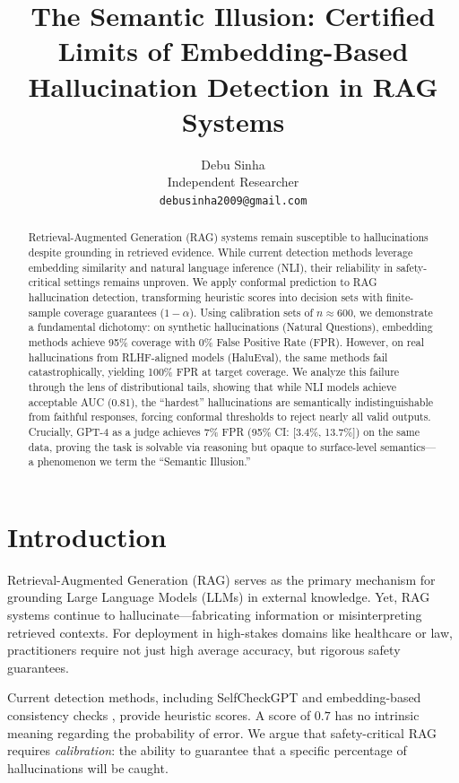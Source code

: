 \documentclass[11pt]{article}
\title{\textbf{The Semantic Illusion: Certified Limits of Embedding-Based Hallucination Detection in RAG Systems}}
\author{
  Debu Sinha \\
  Independent Researcher \\
  \texttt{debusinha2009@gmail.com}
}
\date{}
\begin{document}
\maketitle

\begin{abstract}
\noindent Retrieval-Augmented Generation (RAG) systems remain susceptible to hallucinations despite grounding in retrieved evidence. While current detection methods leverage embedding similarity and natural language inference (NLI), their reliability in safety-critical settings remains unproven. We apply conformal prediction to RAG hallucination detection, transforming heuristic scores into decision sets with finite-sample coverage guarantees ($1-\alpha$). Using calibration sets of $n \approx 600$, we demonstrate a fundamental dichotomy: on synthetic hallucinations (Natural Questions), embedding methods achieve 95\% coverage with 0\% False Positive Rate (FPR). However, on real hallucinations from RLHF-aligned models (HaluEval), the same methods fail catastrophically, yielding 100\% FPR at target coverage. We analyze this failure through the lens of distributional tails, showing that while NLI models achieve acceptable AUC (0.81), the ``hardest'' hallucinations are semantically indistinguishable from faithful responses, forcing conformal thresholds to reject nearly all valid outputs. Crucially, GPT-4 as a judge achieves 7\% FPR (95\% CI: [3.4\%, 13.7\%]) on the same data, proving the task is solvable via reasoning but opaque to surface-level semantics---a phenomenon we term the ``Semantic Illusion.''
\end{abstract}

\section{Introduction}

Retrieval-Augmented Generation (RAG) \cite{lewis2020retrieval} serves as the primary mechanism for grounding Large Language Models (LLMs) in external knowledge. Yet, RAG systems continue to hallucinate---fabricating information or misinterpreting retrieved contexts. For deployment in high-stakes domains like healthcare or law, practitioners require not just high average accuracy, but rigorous safety guarantees.

Current detection methods, including SelfCheckGPT \cite{manakul2023selfcheckgpt} and embedding-based consistency checks \cite{xiang2025redeep}, provide heuristic scores. A score of $0.7$ has no intrinsic meaning regarding the probability of error. We argue that safety-critical RAG requires \textit{calibration}: the ability to guarantee that a specific percentage of hallucinations will be caught.
\end{document}
